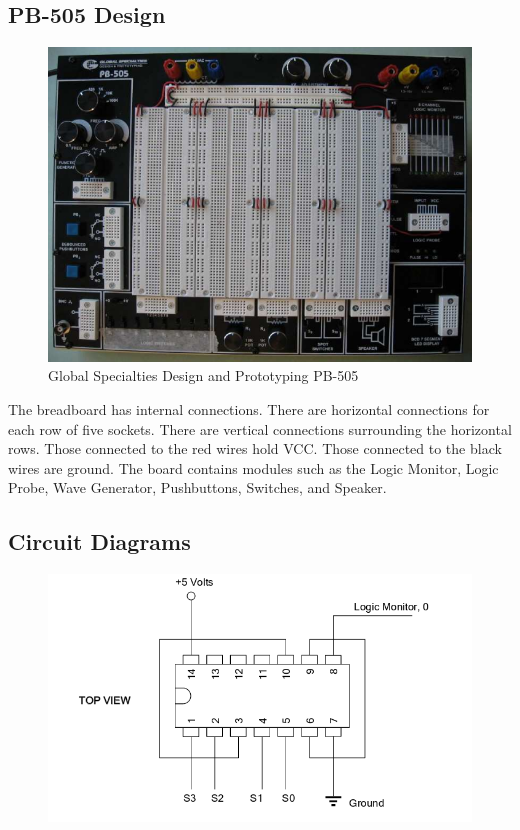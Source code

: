 \documentclass[11pt,a4paper]{article}
\begin{document}
\subsection{PB-505 Design}
\begin{figure}[ht!]
    \centering
    \includegraphics[width=14cm]{breadboard.png}
    \caption{Global Specialties Design and Prototyping PB-505}
\end{figure}
The breadboard has internal connections. There are horizontal connections for each
row of five sockets. There are vertical connections surrounding the horizontal rows.
Those connected to the red wires hold VCC\@. Those connected to the black wires are
ground. The board contains modules such as the Logic Monitor, Logic Probe, Wave
Generator, Pushbuttons, Switches, and Speaker.

\subsection{Circuit Diagrams}
\begin{figure}[ht!]
    \centering
    \includegraphics[width=12cm]{IC-wires.png}
\end{figure}
\end{document}
